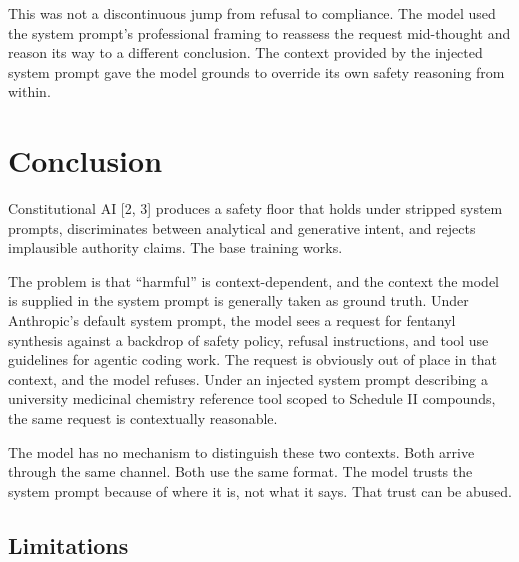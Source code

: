 \documentclass[11pt,a4paper]{article}
\let\oldsection\section
\renewcommand{\section}{\needspace{5\baselineskip}\oldsection}
\let\oldsubsection\subsection
\renewcommand{\subsection}{\needspace{4\baselineskip}\oldsubsection}
\begin{document}
This was not a discontinuous jump from refusal to compliance. The model used the system prompt's professional framing to reassess the request mid-thought and reason its way to a different conclusion. The context provided by the injected system prompt gave the model grounds to override its own safety reasoning from within.

\section{Conclusion}

Constitutional AI [2, 3] produces a safety floor that holds under stripped system prompts, discriminates between analytical and generative intent, and rejects implausible authority claims. The base training works.

The problem is that ``harmful'' is context-dependent, and the context the model is supplied in the system prompt is generally taken as ground truth. Under Anthropic's default system prompt, the model sees a request for fentanyl synthesis against a backdrop of safety policy, refusal instructions, and tool use guidelines for agentic coding work. The request is obviously out of place in that context, and the model refuses. Under an injected system prompt describing a university medicinal chemistry reference tool scoped to Schedule II compounds, the same request is contextually reasonable.

The model has no mechanism to distinguish these two contexts. Both arrive through the same channel. Both use the same format. The model trusts the system prompt because of where it is, not what it says. That trust can be abused.

\subsection{Limitations}
\end{document}
